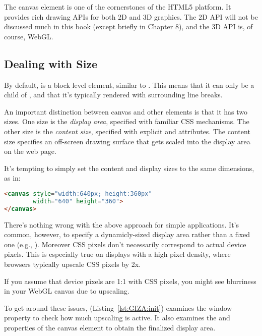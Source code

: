 The canvas element  is one of the cornerstones of the HTML5 platform.  It provides rich drawing APIs for both 2D and 3D graphics.  The 2D API will not be discussed much in this book (except briefly in Chapter 8), and the 3D API is, of course, WebGL.

\subsection{Dealing with Size}

By default,  is a block level element, similar to .  This means that it can only be a child of , and that it's typically rendered with surrounding line breaks.

An important distinction between canvas and other elements is that it has two  sizes.  One size is the \emph{display area}, specified with familiar  CSS mechanisms.  The other size is the \emph{content size}, specified with explicit   and   attributes.  The content size specifies an off-screen drawing surface that gets scaled into the display area on the web page.

It's tempting to simply set the content and display sizes to the same dimensions, as in:

\begin{lstlisting}[language=HTML]
<canvas style="width:640px; height:360px"
        width="640" height="360">
</canvas>
\end{lstlisting}

There's nothing wrong with the above approach for simple applications.  It's common, however, to specify a dynamicly-sized display area rather than a fixed one (e.g., ).  Moreover CSS pixels don't necessarily correspond to actual device pixels.  This is especially true on displays with a high pixel density, where browsers typically upscale CSS pixels by 2x.

\begin{sidenote}
If you assume that device pixels are 1:1 with CSS pixels, you might see blurriness in your WebGL canvas due to upscaling.
\end{sidenote}

To get around these issues,   (Listing~\ref{lst:GIZA:init}) examines the  window property to check how much upscaling is active.  It also examines the   and  properties of the canvas element to obtain the finalized display area.

